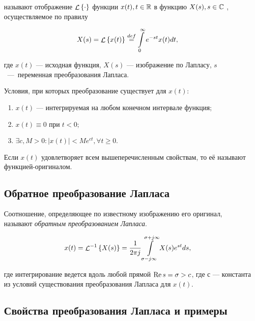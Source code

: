 \documentclass[../../TAU.tex]{subfiles}
\begin{document}
     называют отображение 
    $\mathop{\mathcal{L}}\nolimits\left\{\cdot\right\}$ 
    функции 
    $x(t), t\in\mathbb{R}$
     в функцию 
    $X(s), s\in\mathbb{C}$
    , осуществляемое по правилу
    
    \begin{equation}
        X(s) = \mathop{\mathcal{L}}\nolimits\left\{x(t)\right\} \stackrel{def}{=} \int\limits_0^\infty e^{-st} x(t) dt,
    \end{equation}
    
    где $x(t)$ --- исходная функция, $X(s)$ --- изображение по Лапласу, $s$~---~переменная преобразования Лапласа.


    Условия, при которых преобразование существует для $x(t)$:
    
    \begin{enumerate}
        \item $x(t)$ --- интегрируемая на любом конечном интервале функция;
        \item $x(t)\equiv0$ при $t < 0$;
        \item $\exists c, M > 0: |x(t)| < M e^{ct}, \forall t \ge 0$.
    \end{enumerate}

    Если $x(t)$ удовлетворяет всем вышеперечисленным свойствам, то её называют функцией-оригиналом.

\subsection{Обратное преобразование Лапласа} %

    Соотношение, определяющее по известному изображению его оригинал, называют {\it обратным преобразованием Лапласа}. 

    \begin{equation}
        x(t) = {\mathop{\mathcal{L}}\nolimits^{-1}\left\{X(s)\right\}} = \frac{1}{2\pi j} \int\limits_{\sigma-j\infty}^{\sigma + j\infty} X(s)e^{st} ds,
    \end{equation}
    
    где интегрирование ведется вдоль любой прямой 
    $\mathop{\mathrm{Re}}\nolimits{s} = \sigma > c$, 
    где $с$ --- константа из условий существования преобразования Лапласа для $x(t)$.


\subsection{Свойства преобразования Лапласа и примеры} %
\end{document}
